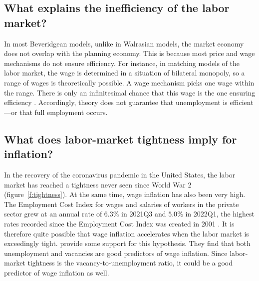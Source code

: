 \documentclass[letterpaper,12pt,leqno]{article}
\newcommand{\bib}{../../../bibliography/businesscycle.bib}
\begin{document}
\subsection{What explains the inefficiency of the labor market?}

In most Beveridgean models, unlike in Walrasian models, the market economy does not overlap with the planning economy. This is because most price and wage mechanisms do not ensure efficiency. For instance, in matching models of the labor market, the wage is determined in a situation of bilateral monopoly, so a range of wages is theoretically possible. A wage mechanism picks one wage within the range. There is only an infinitesimal chance that this wage is the one ensuring efficiency \citep[p.~185]{P00}. Accordingly, theory does not guarantee that unemployment is efficient---or that full employment occurs.

\subsection{What does labor-market tightness imply for inflation?}

In the recovery of the coronavirus pandemic in the United States, the labor market has reached a tightness never seen since World War 2 (figure~\ref{f:tightness}). At the same time, wage inflation has also been very high. The Employment Cost Index for wages and salaries of workers in the private sector grew at an annual rate of $6.3\%$ in 2021Q3 and $5.0\%$ in 2022Q1, the highest rates recorded since the Employment Cost Index was created in 2001 \citep{ECIWAG}. It is therefore quite possible that wage inflation accelerates when the labor market is exceedingly tight. \citet{DS22} provide some support for this hypothesis. They find that both unemployment and vacancies are good predictors of wage inflation. Since labor-market tightness is the vacancy-to-unemployment ratio, it could be a good predictor of wage inflation as well.


\end{document}
